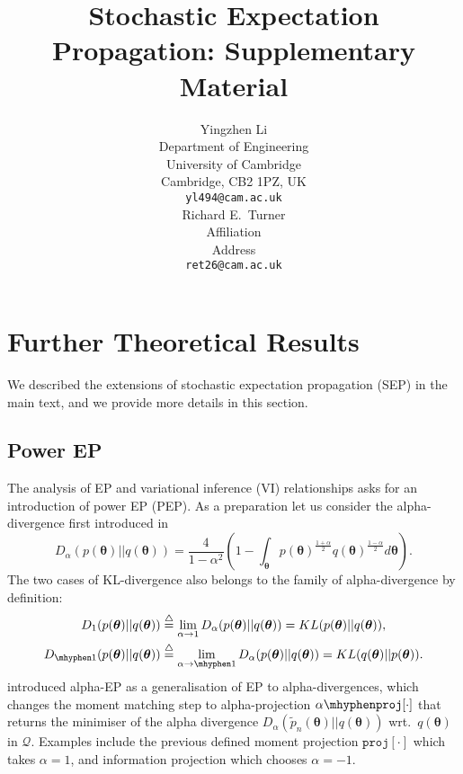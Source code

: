 \documentclass{article} %
\title{Stochastic Expectation Propagation: Supplementary Material}
\author{
Yingzhen Li \\
Department of Engineering\\
University of Cambridge\\
Cambridge, CB2 1PZ, UK \\
\texttt{yl494@cam.ac.uk} \\
\And
Richard E.~Turner \\
Affiliation \\
Address \\
\texttt{ret26@cam.ac.uk} \\
}
\begin{document}
\maketitle

\appendix

\section{Further Theoretical Results}
We described the extensions of stochastic expectation propagation (SEP) in the main text, and we provide more details in this section.
\subsection{Power EP}
The analysis of EP and variational inference (VI) relationships asks for an introduction of power EP (PEP). As a preparation let us consider the alpha-divergence first introduced in \cite{amari:ig1985}
\begin{equation}
D_{\alpha}(p(\bm{\theta}) || q(\bm{\theta})) = \frac{4}{1 - \alpha^2} 
		\left( 1 - \int_{\bm{\theta}} p(\bm{\theta})^{ \frac{1+\alpha}{2}} q(\bm{\theta})^{ \frac{1- \alpha}{2}} d\bm{\theta} \right).
\end{equation} 
The two cases of KL-divergence also belongs to the family of alpha-divergence by definition:
\begin{align}
D_{1}(p(\bm{\theta})||q(\bm{\theta})) &\buildrel\triangle\over = \lim_{\alpha \rightarrow 1} D_{\alpha}(p(\bm{\theta})||q(\bm{\theta}))  = KL(p(\bm{\theta}) || q(\bm{\theta})), \\
D_{ \mhyphen 1}(p(\bm{\theta})||q(\bm{\theta})) &\buildrel\triangle\over = \lim_{\alpha \rightarrow \mhyphen 1} D_{\alpha}(p(\bm{\theta}) || q(\bm{\theta}))  = KL(q(\bm{\theta}) || p(\bm{\theta})).
\end{align}
\cite{minka:powerep} introduced alpha-EP as a generalisation of EP to alpha-divergences, which changes the moment matching step to alpha-projection $\alpha \mhyphen \mathtt{proj}[\cdot]$ \cite{amari:alpha_proj} that returns the minimiser of the alpha divergence $D_{\alpha}(\tilde{p}_n(\bm{\theta}) || q(\bm{\theta}))$ wrt.~$q(\bm{\theta})$ in $\mathcal{Q}$. Examples include the previous defined moment projection $\mathtt{proj}[\cdot]$ which takes $\alpha = 1$, and information projection which chooses $\alpha = -1$. 
\end{document}
